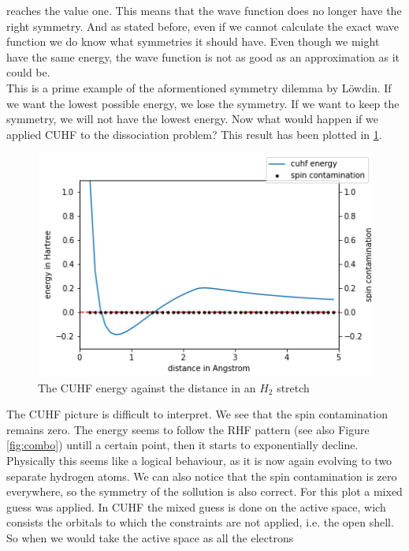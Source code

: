 \documentclass[twoside,twocolumn,9pt]{article}
\begin{document}
reaches the value one. This means that the wave function does no longer have the right symmetry. And as stated before, even if we cannot calculate the exact wave function we do know
what symmetries it should have. Even though we might have the same energy, the wave function is not as good as an approximation as it could be\cite{Scuseria2013}. \\
This is a prime example of the aformentioned symmetry dilemma by Löwdin. If we want the lowest possible energy, we lose the symmetry. If we want to keep the symmetry, we will not
have the lowest energy. Now what would happen if we applied CUHF to the dissociation problem? This result has been plotted in \ref{fig:cuhfstretch}.
\begin{center}
  \begin{figure}[h]
    \includegraphics[width=\linewidth]{./../notes/figures/cuhf_mix.png}
    \caption{The CUHF energy against the distance in an $H_2$ stretch}
    \label{fig:cuhfstretch}
  \end{figure}
\end{center}
The CUHF picture is difficult to interpret. We see that the spin contamination remains zero. The energy seems to follow the RHF pattern (see also Figure \ref{fig:combo}) untill a
certain point, then it starts to exponentially decline. Physically this seems like a logical behaviour, as it is now again evolving to two separate hydrogen atoms. We can also notice
that the spin contamination is zero everywhere, so the symmetry of the sollution is also correct. For this plot a mixed guess was applied. In CUHF the mixed guess is done on the
active space, wich consists the orbitals to which the constraints are not applied, i.e. the open shell\cite{Scuseria2011}. So when we would take the active space as all the electrons
\end{document}
